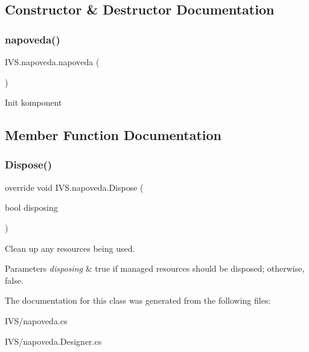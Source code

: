 \subsection{Constructor \& Destructor Documentation}
\mbox{\label{class_i_v_s_1_1napoveda_a97471343e0e827c2f75fc4c64937f515}} 
\subsubsection{\texorpdfstring{napoveda()}{napoveda()}}
{\footnotesize\ttfamily I\+V\+S.\+napoveda.\+napoveda (\begin{DoxyParamCaption}{ }\end{DoxyParamCaption})}



Init komponent 



\subsection{Member Function Documentation}
\mbox{\label{class_i_v_s_1_1napoveda_aeec632e7bb98b05061ff7ab39373ef4b}} 
\subsubsection{\texorpdfstring{Dispose()}{Dispose()}}
{\footnotesize\ttfamily override void I\+V\+S.\+napoveda.\+Dispose (\begin{DoxyParamCaption}\item[{bool}]{disposing }\end{DoxyParamCaption})\hspace{0.3cm}{\ttfamily [protected]}}



Clean up any resources being used. 


\begin{DoxyParams}{Parameters}
{\em disposing} & true if managed resources should be disposed; otherwise, false.\\
\hline
\end{DoxyParams}


The documentation for this class was generated from the following files\+:\begin{DoxyCompactItemize}
\item 
I\+V\+S/napoveda.\+cs\item 
I\+V\+S/napoveda.\+Designer.\+cs\end{DoxyCompactItemize}
